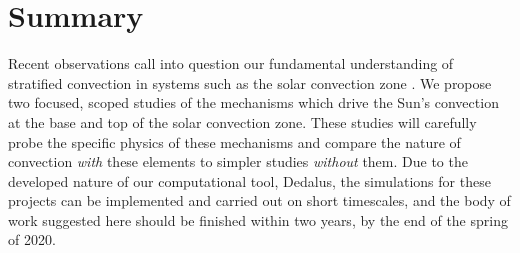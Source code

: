 \documentclass[aasms,12pt]{article}
\begin{document}
\section{Summary}
Recent observations call into question our fundamental understanding of stratified
convection in systems such as the solar convection zone \citep{hanasoge&all2012, greer&all2015}.
We propose two focused, scoped studies of the mechanisms which drive the Sun's convection at
the base and top of the solar convection zone. 
These studies will carefully probe the specific physics of these mechanisms and compare the
nature of convection \emph{with} these elements to simpler studies \emph{without} them.
Due to the developed nature of
our computational tool, Dedalus, the simulations for these projects can be implemented and
carried out on short timescales, and the body of work suggested here should be finished within
two years, by the end of the spring of 2020.


\newpage


\end{document}
